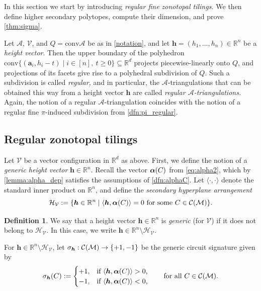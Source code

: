 \documentclass[11pt]{amsart}
\theoremstyle{plain}
\theoremstyle{definition}
\newtheorem{definition}[theorem]{Definition}
\def\R{\mathbb{R}}
\def\A{\mathcal{A}}
\def\Acal{\mathcal{A}}
\def\V{\mathcal{V}}
\def\h{{\bm{h}}}
\def\a{{\bm{a}}}
\def\conv{\mathrm{conv}}
\def\Zon{\mathcal{Z}}
\def\VC{\V}
\def\tile{\Pi}
\let\subset\subseteq
\begin{document}
In this section we start by introducing \emph{regular fine zonotopal tilings.}
We then define higher secondary polytopes, compute their dimension, and 
prove \cref{thm:sigma}. 

Let $\A$, $\V$, and $Q = \conv \A$ 
be as in \cref{notation}, and   
let $\h=(h_1,\dots,h_n)\in \R^n$ be a  \emph{height vector}. 
Then the upper boundary of the polyhedron $\conv\{(\a_i,h_i-t)\mid i\in[n],\ t\geq0\}\subset \R^d$ projects piecewise-linearly onto $Q$, and projections of its facets give rise to a polyhedral 
subdivision  of $Q$.   Such a subdivision is called \emph{regular,} and in particular, the 
$\Acal$-triangulations that can be obtained this way from a height vector $\h$ are called \emph{regular $\A$-triangulations.} Again, the notion of a regular $\A$-triangulation coincides with the notion of a regular fine $\pi$-induced subdivision from \cref{dfn:pi_regular}.

\def\H{{\mathcal{H_\V}}}
\def\vt{{\tilde{\bm{v}}}}
\def\tZon{{\widetilde\Zon}}
\def\tPi{{\widetilde{\tile}}}
\def\<{\langle}
\def\>{\rangle}
\def\GHV{\R^n\setminus \H}
\subsection{Regular zonotopal tilings}\label{sec:regular_zon_tilings}
Let $\VC$ be a vector configuration in $\R^d$ as above. First, we define the notion of a \emph{generic height vector} $\h\in\R^n$. 
Recall the vector $\bm{\alpha}(C)$ from \eqref{eq:alpha2}, 
which by \cref{lemma:alpha_dep} satisfies
 the assumptions of \cref{dfn:alphaC}. 
Let $\<\cdot,\cdot\>$ denote the standard inner product on $\R^n$, and define the \emph{secondary hyperplane arrangement}
\begin{equation}\label{eq:H_sec_arr}
\H:=\{\h\in\R^n\mid \<\h,\alphaC\>=0\ \text{for some $C\in\Circuits$}\}.
\end{equation}
\begin{definition}
	We say that a height vector $\h\in\R^n$ is \emph{generic} (for $\V$) if it does not belong to $\H$. In this case, we write $\h\in\GHV$.
\end{definition}
\noindent For $\h\in\GHV$, let $\sigma_\h:\Circuits\to\{+1,-1\}$ be the generic circuit signature given by 
\begin{equation}\label{eq:circuit}
	\sigma_\h(C):=
  \begin{cases}
    +1, &\text{if $\<\h,\alphaC\>>0$,}\\
    -1, &\text{if $\<\h,\alphaC\><0$,}\\
  \end{cases}\qquad \text{for all $C\in\Circuits$.} 
\end{equation}
\end{document}
